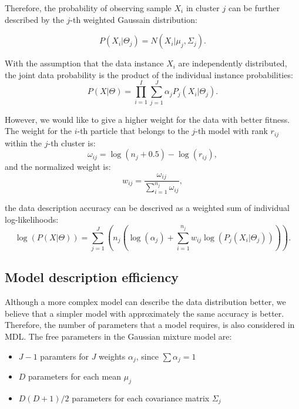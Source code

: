 Therefore, the probability of observing sample $X_i$ in cluster $j$ can be further described by the $j$-th weighted Gaussain distribution:

\begin{equation}
P(X_i|\Theta_j) = N(X_i | \mu_j, \Sigma_j).
\end{equation}

With the assumption that the data instance $X_i$ are independently distributed, 
the joint data probability is the product of the individual instance probabilities:
\begin{equation}
P(X|\Theta) = \prod_{i=1}^{I} \sum_{j=1}^{J} \alpha_j P_j(X_i | \Theta_j).
\end{equation}

However, we would like to give a higher weight for the data with better fitness.
The weight for the $i$-th particle that belongs to the $j$-th model with rank $r_{ij}$ within the $j$-th cluster is:
\begin{equation}
\omega_{ij} = \log(n_j+0.5) - \log(r_{ij}),
\end{equation}
and the normalized weight is: 
\begin{equation}
w_{ij} = \frac{\omega_{ij}}{\sum_{i = 1}^{n_j}\omega_{ij}},
\end{equation}

the data description accuracy can be descrived as a weighted sum of individual log-likelihoods:
\begin{equation}
\log(P(X|\Theta)) = \sum_{j=1}^{J}( n_j(\log(\alpha_j) + \sum_{i=1}^{n_j} w_{ij} \log(P_j(X_i | \Theta_j))) ).
\end{equation}


\subsection{Model description efficiency}
Although a more complex model can describe the data distribution better, 
we believe that a simpler model with approximately the same accuracy is better.
Therefore, the number of parameters that a model requires, is also considered in MDL.
The free parameters in the Gaussian mixture model are:
\begin{itemize}
\item $J-1$ paramters for $J$ weights $\alpha_j$, since $\sum \alpha_j = 1$
\item $D$ parameters for each mean $\mu_j$
\item $D(D+1)/2$ parameters for each covariance matrix $\Sigma_j$
\end{itemize}

